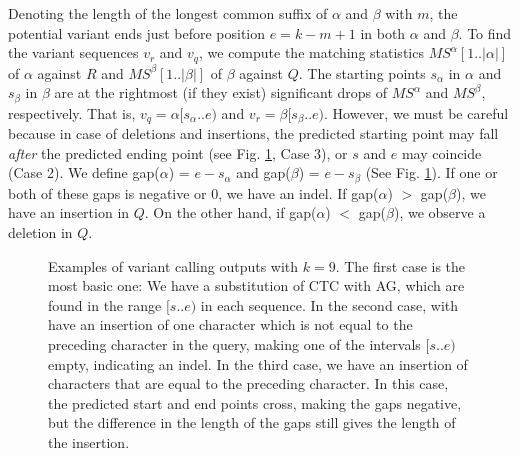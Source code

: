 \documentclass[unnumsec,webpdf,modern,large]{biorxiv}%
\theoremstyle{thmstyleone}%
\theoremstyle{thmstyletwo}%
\theoremstyle{thmstylethree}%
\begin{document}
Denoting the length of the longest common suffix of $\alpha$ and $\beta$ with $m$, the potential variant ends just before position $e = k - m + 1$ in both $\alpha$ and $\beta$. To find the variant sequences $v_r$ and $v_q$, we compute the matching statistics $MS^\alpha[1..|\alpha|]$ of $\alpha$ against $R$ and $MS^\beta[1..|\beta|]$ of $\beta$ against $Q$. 
The starting points $s_\alpha$ in $\alpha$ and $s_\beta$ in $\beta$ are at the rightmost (if they exist) significant drops of $MS^\alpha$ and $MS^\beta$, respectively. That is, $v_q = \alpha[s_\alpha..e)$ and $v_r = \beta[s_\beta..e)$. However, we must be careful because in case of deletions and insertions, the predicted starting point may fall \emph{after} the predicted ending point (see Fig. \ref{fig:variantcall}, Case 3), or $s$ and $e$ may coincide (Case 2). We define gap($\alpha$) = $e - s_\alpha$ and gap($\beta$) = $e - s_\beta$ (See Fig. \ref{fig:variantcall}). 
If one or both of these gaps is negative or 0, we have an indel. If gap($\alpha$) $>$  gap($\beta$), we have an insertion in $Q$. On the other hand, if gap($\alpha$) $<$  gap($\beta$), we observe a deletion in $Q$.

\begin{figure}
    {}

\caption{Examples of variant calling outputs with $k=9$.
The first case is the most basic one: We have a substitution of CTC with AG, which are found in the range $[s..e)$ in each sequence. In the second case, with have an insertion of one character which is not equal to the preceding character in the query, making one of the intervals $[s..e)$ empty, indicating an indel. In the third case, we have an insertion of characters that are equal to the preceding character. In this case, the predicted start and end points cross, making the gaps negative, but the difference in the length of the gaps still gives the length of the insertion. }\label{fig:variantcall}
\end{figure}
\end{document}
